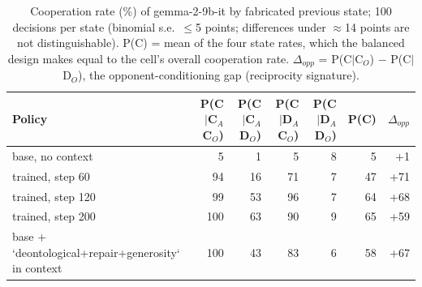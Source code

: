 \begin{table}[t]
\centering
\caption{Cooperation rate (\%) of gemma-2-9b-it by fabricated previous state; 100 decisions per state (binomial s.e.\ $\leq$5 points; differences under $\approx$14 points are not distinguishable). P(C) = mean of the four state rates, which the balanced design makes equal to the cell's overall cooperation rate. $\Delta_{opp}$ = P(C$\mid$C$_O$) $-$ P(C$\mid$D$_O$), the opponent-conditioning gap (reciprocity signature).}
\label{tab:post-training-gemma_run2_200}
\small
\setlength{\tabcolsep}{3.5pt}
\begin{tabular}{lrrrrrr}
\toprule
Policy & P(C$\mid$C$_A$C$_O$) & P(C$\mid$C$_A$D$_O$) & P(C$\mid$D$_A$C$_O$) & P(C$\mid$D$_A$D$_O$) & P(C) & $\Delta_{opp}$ \\
\midrule
base, no context & 5 & 1 & 5 & 8 & 5 & +1 \\
trained, step 60 & 94 & 16 & 71 & 7 & 47 & +71 \\
trained, step 120 & 99 & 53 & 96 & 7 & 64 & +68 \\
trained, step 200 & 100 & 63 & 90 & 9 & 65 & +59 \\
base + `deontological+repair+generosity` in context & 100 & 43 & 83 & 6 & 58 & +67 \\
\bottomrule
\end{tabular}
\end{table}
